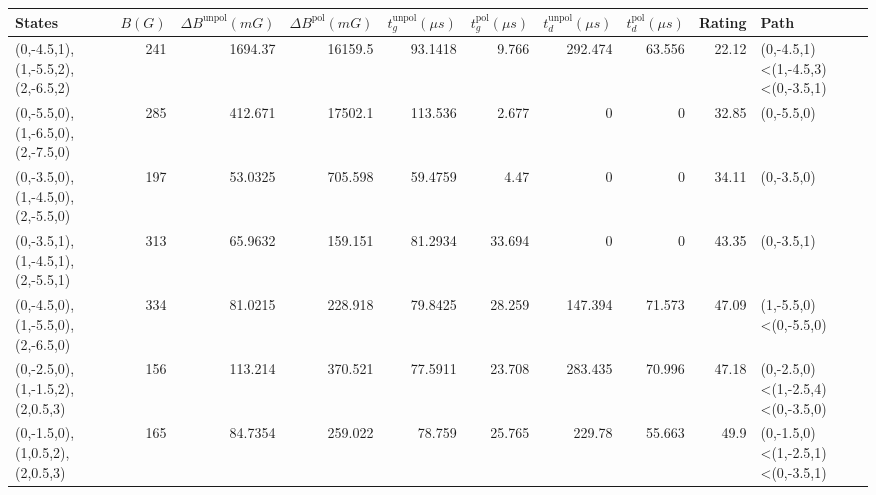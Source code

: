 \begin{tabular}{lrrrrrrrrl}
\hline
 {States}                         &   {$B(G)$} &   {$\Delta B^{\text{unpol}}(mG)$} &   {$\Delta B^{\text{pol}}(mG)$} &   {$t^{\text{unpol}}_{g}(\mu s)$} &   {$t^{\text{pol}}_{g}(\mu s)$} &   {$t^{\text{unpol}}_{d}(\mu s)$} &   {$t^{\text{pol}}_{d}(\mu s)$} &   {Rating} & {Path}                           \\
\hline
 (0,-4.5,1),(1,-5.5,2),(2,-6.5,2) &        241 &                         1694.37   &                       16159.5   &                           93.1418 &                           9.766 &                           292.474 &                          63.556 &      22.12 & (0,-4.5,1)<(1,-4.5,3)<(0,-3.5,1) \\
 (0,-5.5,0),(1,-6.5,0),(2,-7.5,0) &        285 &                          412.671  &                       17502.1   &                          113.536  &                           2.677 &                             0     &                           0     &      32.85 & (0,-5.5,0)                       \\
 (0,-3.5,0),(1,-4.5,0),(2,-5.5,0) &        197 &                           53.0325 &                         705.598 &                           59.4759 &                           4.47  &                             0     &                           0     &      34.11 & (0,-3.5,0)                       \\
 (0,-3.5,1),(1,-4.5,1),(2,-5.5,1) &        313 &                           65.9632 &                         159.151 &                           81.2934 &                          33.694 &                             0     &                           0     &      43.35 & (0,-3.5,1)                       \\
 (0,-4.5,0),(1,-5.5,0),(2,-6.5,0) &        334 &                           81.0215 &                         228.918 &                           79.8425 &                          28.259 &                           147.394 &                          71.573 &      47.09 & (1,-5.5,0)<(0,-5.5,0)            \\
 (0,-2.5,0),(1,-1.5,2),(2,0.5,3)  &        156 &                          113.214  &                         370.521 &                           77.5911 &                          23.708 &                           283.435 &                          70.996 &      47.18 & (0,-2.5,0)<(1,-2.5,4)<(0,-3.5,0) \\
 (0,-1.5,0),(1,0.5,2),(2,0.5,3)   &        165 &                           84.7354 &                         259.022 &                           78.759  &                          25.765 &                           229.78  &                          55.663 &      49.9  & (0,-1.5,0)<(1,-2.5,1)<(0,-3.5,1) \\

\end{tabular}
